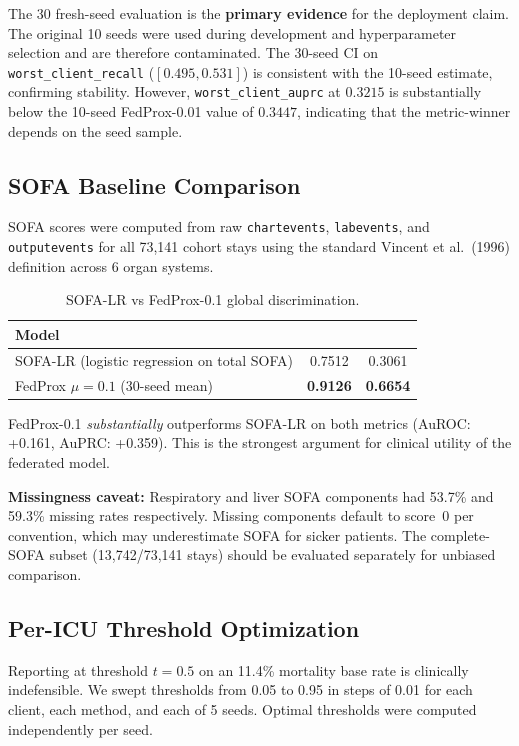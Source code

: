 The 30 fresh-seed evaluation is the \textbf{primary evidence} for the deployment claim. The original 10 seeds were used during development and hyperparameter selection and are therefore contaminated. The 30-seed CI on \texttt{worst\_client\_recall} ($[0.495, 0.531]$) is consistent with the 10-seed estimate, confirming stability. However, \texttt{worst\_client\_auprc} at $0.3215$ is substantially below the 10-seed FedProx-0.01 value of $0.3447$, indicating that the metric-winner depends on the seed sample.

\subsection{SOFA Baseline Comparison}
\label{sec:sofa-baseline}

SOFA scores were computed from raw \texttt{chartevents}, \texttt{labevents}, and \texttt{outputevents} for all 73,141 cohort stays using the standard Vincent et al.\ (1996) definition across 6 organ systems.

\begin{table}[h]
\centering
\caption{SOFA-LR vs FedProx-0.1 global discrimination.}
\label{tab:sofa-comparison}
\begin{tabular}{lcc}
\toprule
Model & \auroc{} & \auprc{} \\
\midrule
SOFA-LR (logistic regression on total SOFA) & 0.7512 & 0.3061 \\
FedProx $\mu=0.1$ (30-seed mean) & \textbf{0.9126} & \textbf{0.6654} \\
\bottomrule
\end{tabular}
\end{table}

FedProx-0.1 \emph{substantially} outperforms SOFA-LR on both metrics (AuROC: +0.161, AuPRC: +0.359). This is the strongest argument for clinical utility of the federated model.

\textbf{Missingness caveat:} Respiratory and liver SOFA components had 53.7\% and 59.3\% missing rates respectively. Missing components default to score~0 per convention, which may underestimate SOFA for sicker patients. The complete-SOFA subset (13,742/73,141 stays) should be evaluated separately for unbiased comparison.

\subsection{Per-ICU Threshold Optimization}
\label{sec:threshold}

Reporting at threshold $t=0.5$ on an 11.4\% mortality base rate is clinically indefensible. We swept thresholds from 0.05 to 0.95 in steps of 0.01 for each client, each method, and each of 5 seeds. Optimal thresholds were computed independently per seed.

